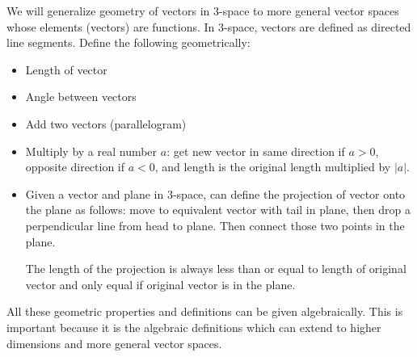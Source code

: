 \documentclass[]{article}
\begin{document}
We will generalize geometry of vectors in 3-space to more general vector spaces whose elements (vectors) are functions.
In 3-space, vectors are defined as directed line segments. %
Define the following geometrically:
\begin{itemize}
	\item Length of vector
	\item Angle between vectors
	\item Add two vectors (parallelogram)
	\item Multiply by a real number $a$: get new vector in same direction if $a > 0$, opposite direction if $a<0$, and length is the original length multiplied by $|a|$.
	\item Given a vector and plane in 3-space, can define the projection of vector onto the plane as follows: move to equivalent vector with tail in plane, then drop a perpendicular line from head to plane. Then connect those two points in the plane.
	\begin{note}
		The length of the projection is always less than or equal to length of original vector and only equal if original vector is in the plane.
	\end{note}
\end{itemize}
All these geometric properties and definitions can be given algebraically. This is important because it is the algebraic definitions which can extend to higher dimensions and more general vector spaces.
\end{document}
